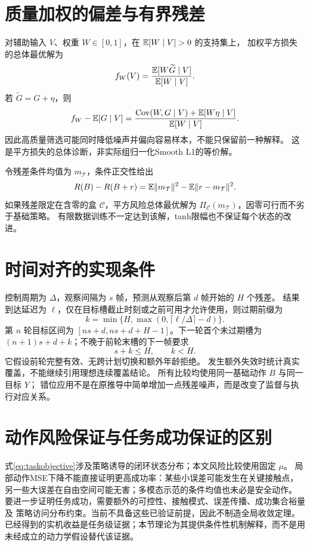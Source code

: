 \section{质量加权的偏差与有界残差}
对辅助输入 $V$、权重 $W\in[0,1]$，在 $\mathbb E[W\mid V]>0$ 的支持集上，
加权平方损失的总体最优解为
\begin{equation}
 f_W(V)=\frac{\mathbb E[W\widetilde G\mid V]}{\mathbb E[W\mid V]}.
\end{equation}
若 $\widetilde G=G+\eta$，则
\begin{equation}
 f_W-\mathbb E[G\mid V]
 =\frac{\operatorname{Cov}(W,G\mid V)+\mathbb E[W\eta\mid V]}{\mathbb E[W\mid V]}.
 \label{eq:weightbias}
\end{equation}
因此高质量筛选可能同时降低噪声并偏向容易样本，不能只保留前一种解释。
这是平方损失的总体诊断，非实际组归一化Smooth L1的等价解。

令残差条件均值为 $m_\mathcal T$，条件正交性给出
\begin{equation}
 R(B)-R(B+r)=\mathbb E\lVert m_\mathcal T\rVert^2-\mathbb E\lVert r-m_\mathcal T\rVert^2.
\end{equation}
如果残差限定在含零的盒 $\mathcal C$，平方风险总体最优解为
$\Pi_{\mathcal C}(m_\mathcal T)$，因零可行而不劣于基础策略。
有限数据训练不一定达到该解，tanh限幅也不保证每个状态的改进。

\section{时间对齐的实现条件}
控制周期为 $\Delta$，观察间隔为 $s$ 帧，预测从观察后第 $d$ 帧开始的 $H$ 个残差。
结果到达延迟为 $\ell$，仅在目标槽截止时刻或之前可用才允许使用，则过期前缀为
\begin{equation}
 k=\min\{H,\max(0,\lceil\ell/\Delta\rceil-d)\}.
 \label{eq:delay}
\end{equation}
第 $n$ 轮目标区间为 $[ns+d,ns+d+H-1]$。下一轮首个未过期槽为
$(n+1)s+d+k$；不晚于前轮末槽的下一帧要求
\begin{equation}
 s+k\leq H,\qquad k<H.
 \label{eq:coverage}
\end{equation}
它假设前轮完整有效、无跨计划切换和额外年龄拒绝。
发生额外失效时统计真实覆盖，不能继续引用理想连续覆盖结论。
所有比较均使用同一基础动作 $B$ 与同一目标 $Y$；
错位应用不是在原推导中简单增加一点残差噪声，而是改变了监督与执行对应关系。

\section{动作风险保证与任务成功保证的区别}
式\eqref{eq:taskobjective}涉及策略诱导的闭环状态分布；本文风险比较使用固定 $\mu$。
局部动作MSE下降不能直接证明更高成功率：某些小误差可能发生在关键接触点，
另一些大误差在自由空间可能无害；多模态示范的条件均值也未必是安全动作。
要进一步证明任务成功，需要额外的可控性、接触模式、误差传播、成功集合裕量及
策略访问分布约束。当前不具备这些已验证前提，因此不制造全局收敛定理。
已经得到的实机收益是任务级证据；本节理论为其提供条件性机制解释，而不是用
未经成立的动力学假设替代该证据。
